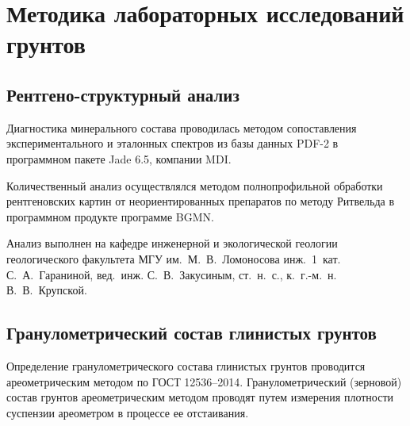\chapter{Методика лабораторных исследований грунтов}\label{ch:ch6}

\section{Рентгено-структурный анализ}


Диагностика минерального состава проводилась методом сопоставления экспериментального и эталонных 
спектров из базы данных PDF-2 в программном пакете Jade 6.5, компании MDI.

Количественный анализ осуществлялся методом полнопрофильной обработки рентгеновских 
картин от неориентированных препаратов по методу Ритвельда  
в программном продукте программе BGMN.

Анализ выполнен на кафедре инженерной и экологической 
геологии геологического факультета МГУ им.~М.~В.~Ломоносова
инж.~1~кат. С.~А.~Гараниной, вед.~инж. С.~В.~Закусиным, ст.~н.~с., к.~г.-м.~н. В.~В.~Крупской.

\section{Гранулометрический состав глинистых грунтов}

Определение гранулометрического состава глинистых грунтов проводится ареометрическим методом 
по ГОСТ 12536--2014. Гранулометрический (зерновой) состав грунтов
ареометрическим методом проводят путем измерения плотности суспензии
ареометром в процессе ее отстаивания. 

